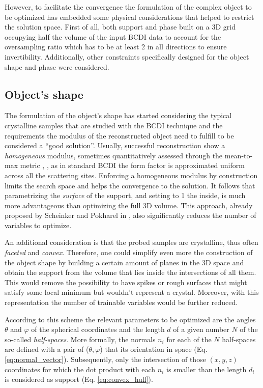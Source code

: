 However, to facilitate the convergence the formulation of the complex object to be optimized has embedded some physical considerations that 
helped to restrict the solution space. First of all, both support and phase built on a 3D grid occupying half the volume of the 
input BCDI data to account for the oversampling ratio which has to be at least 2 in all directions to ensure invertibility.  
Additionally, other constraints specifically designed for the object shape and phase were considered. 

\subsection{Object's shape}

The formulation of the object's shape has started considering the typical crystalline samples that are studied with the BCDI technique
and the requirements the modulus of the reconstructed object need to fulfill to be considered a ``good solution''. 
Usually, successful reconstruction show a \textit{homogeneous} modulus, sometimes quantitatively assessed through the 
mean-to-max metric \cite{Frisch2023CuAgCatalysts} , \cite{Grimes2024CatalystStrain}, as in standard BCDI the form factor is 
approximated uniform across all the scattering sites. Enforcing a homogeneous modulus by construction limits the search space 
and helps the convergence to the solution. 
It follows that parametrizing the \textit{surface} of the support, and setting to 1 the inside, is much more advantageous than optimizing 
the full 3D volume. This approach, already proposed by Scheinker and Pokharel in \cite{scheinker_adaptive_2020}, 
also significantly reduces the number of variables to optimize.

An additional consideration is that the probed samples are crystalline, thus often \textit{faceted} and \textit{convex}. 
Therefore, one could simplify even more the construction of the object shape by building a certain amount of planes in the 
3D space and obtain the support from the volume that lies inside the intersections of all them. This would remove the possibility 
to have spikes or rough surfaces that might satisfy some local minimum but wouldn't represent a crystal. Moreover, with this 
representation the number of trainable variables would be further reduced. 

According to this scheme the relevant parameters to be optimized are the angles $\theta$ and $ \varphi$ of the spherical 
coordinates and the length $d$ of a given number $N$ of the so-called \textit{half-spaces}. 
More formally, the normals $n_i$ for each of the $N$ half-spaces are defined with a pair of ($\theta , \varphi$) that  its
orientation in space (Eq. \ref{eq:normal_vector}). Subsequently, only the intersection of those $(x,y,z)$ coordinates for which the dot product with 
each $n_i$ is smaller than the length $d_i$ is considered as support (Eq. \ref{eq:convex_hull}).



